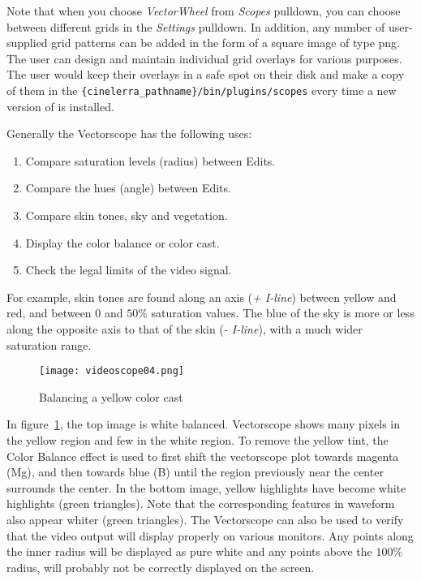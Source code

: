 Note that when you choose \textit{VectorWheel} from \textit{Scopes} pulldown, you can choose between different grids in the \textit{Settings} pulldown. In addition, any number of user-supplied grid patterns can be added in the form of a square image of type png.  The user can design and maintain individual grid overlays for various purposes.  The user would keep their overlays in a safe spot on their disk and make a copy of them in the \texttt{\{cinelerra\_pathname\}/bin/plugins/scopes} every time a new version of \CGG{} is installed.

Generally the Vectorscope has the following uses:

\begin{enumerate}
	\item Compare saturation levels (radius) between Edits.
	\item Compare the hues (angle) between Edits.
	\item Compare skin tones, sky and vegetation.
	\item Display the color balance or color cast.
	\item Check the legal limits of the video signal.
\end{enumerate}

 For example, skin tones are found along an axis (\textit{+ I-line}) between yellow and red, and between $0$ and $50\%$ saturation values. The blue of the sky is more or less along the opposite axis to that of the skin (\textit{- I-line}), with a much wider saturation range.

\begin{figure}[hbtp]
    \centering
    \texttt{[image: videoscope04.png]}
    \caption{Balancing a yellow color cast}
    \label{fig:videoscope04}
\end{figure}

In figure~\ref{fig:videoscope04}, the top image is white balanced. Vectorscope shows many pixels in the yellow region and few in the white region. To remove the yellow tint, the Color Balance effect is used to first shift the vectorscope plot towards magenta (Mg), and then towards blue (B) until the region previously near the center surrounds the center. In the bottom image, yellow highlights have become white highlights (green triangles). Note that the corresponding features in waveform also appear whiter (green triangles).
The Vectorscope can also be used to verify that the video output will display properly on various monitors. Any points along the inner radius will be displayed as pure white and any points above the $100\%$ radius, will probably not be correctly displayed on the screen.

